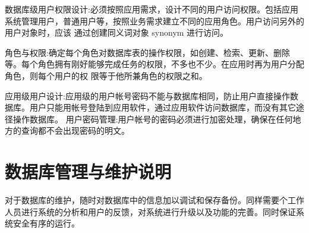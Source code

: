 数据库级用户权限设计:必须按照应用需求，设计不同的用户访问权限。包括应用系统管理用户，普通用户等，按照业务需求建立不同的应用角色。用户访问另外的用户对象时，应该
通过创建同义词对象 synonym 进行访问。

角色与权限:确定每个角色对数据库表的操作权限，如创建、检索、更新、删除等。每个角色拥有刚好能够完成任务的权限，不多也不少。在应用时再为用户分配角色，则每个用户的权
限等于他所兼角色的权限之和。

应用级用户设计:应用级的用户帐号密码不能与数据库相同，防止用户直接操作数据库。用户只能用帐号登陆到应用软件，通过应用软件访问数据库，而没有其它途径操作数据库。
用户密码管理:用户帐号的密码必须进行加密处理，确保在任何地方的查询都不会出现密码的明文。

\section{数据库管理与维护说明}
对于数据库的维护，随时对数据库中的信息加以调试和保存备份。同样需要个工作人员进行系统的分析和用户的反馈，对系统进行升级以及功能的完善。同时保证系统安全有序的运行。
